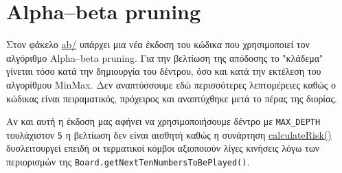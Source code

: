 \chapter{Alpha–beta pruning}
Στον φάκελο \url{ab/} υπάρχει μια νέα έκδοση του κώδικα που χρησιμοποιεί τον αλγόριθμο Alpha–beta pruning.
Για την βελτίωση της απόδοσης το "κλάδεμα" γίνεται τόσο κατά την δημιουργία του δέντρου, όσο και κατά την εκτέλεση του αλγορίθμου MinMax.
Δεν αναπτύσσουμε εδώ περισσότερες λεπτομέρειες καθώς ο κώδικας είναι πειραματικός, πρόχειρος και αναπτύχθηκε μετά το πέρας της διορίας.

Αν και αυτή η έκδοση μας αφήνει να χρησιμοποιήσουμε δέντρο με \lstinline!MAX_DEPTH! τουλάχιστον \lstinline!5! η βελτίωση δεν είναι αισθητή καθώς η συνάρτηση
\hyperref[fun:calculateRisk]{calculateRisk()} δυσλειτουργεί επειδή οι τερματικοί κόμβοι αξιοποιούν λίγες κινήσεις λόγω των περιορισμών της
\lstinline!Board.getNextTenNumbersToBePlayed()!.